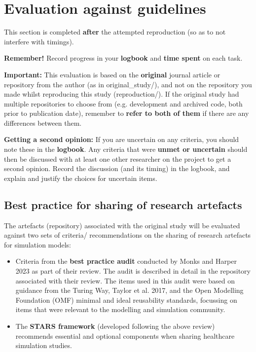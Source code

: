 \section{Evaluation against guidelines}

This section is completed \textbf{after} the attempted reproduction (so as to not interfere with timings).

\textbf{Remember!} Record progress in your \textbf{logbook} and \textbf{time spent} on each task.

\textbf{Important:} This evaluation is based on the \textbf{original} journal article or repository from the author (as in original\_study/), and not on the repository you made whilst reproducing this study (reproduction/). If the original study had multiple repositories to choose from (e.g. development and archived code, both prior to publication date), remember to \textbf{refer to both of them} if there are any differences between them.

\textbf{Getting a second opinion:} If you are uncertain on any criteria, you should note these in the \textbf{logbook}. Any criteria that were \textbf{unmet or uncertain} should then be discussed with at least one other researcher on the project to get a second opinion. Record the discussion (and its timing) in the logbook, and explain and justify the choices for uncertain items.

\vspace{0.5cm}
\subsection{Best practice for sharing of research artefacts}

The artefacts (repository) associated with the original study will be evaluated against two sets of criteria/ recommendations on the sharing of research artefacts for simulation models:
\begin{itemize}
    \item Criteria from the \textbf{best practice audit} conducted by Monks and Harper 2023\autocite{monks_computer_2023} as part of their review. The audit is described in detail in the repository associated with their review.\autocite{monks_supplementary_2024} The items used in this audit were based on guidance from the Turing Way,\autocite{the_turing_way_community_turing_2022} Taylor et al. 2017,\autocite{taylor_open_2017} and the Open Modelling Foundation (OMF) minimal and ideal reusability standards,\autocite{the_open_modeling_foundation_omf_reusability_2024} focussing on items that were relevant to the modelling and simulation community.
    \item The \textbf{STARS framework} (developed following the above review) recommends essential and optional components when sharing healthcare simulation studies.
\end{itemize}

